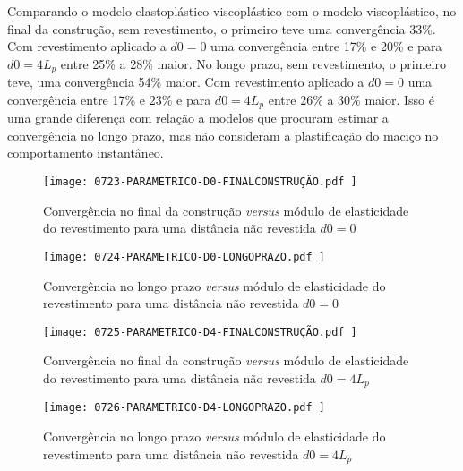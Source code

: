 Comparando o modelo elastoplástico-viscoplástico com o modelo viscoplástico, no final da construção, sem revestimento, o primeiro teve uma convergência 33\%. Com revestimento aplicado a $d0=0$ uma convergência entre 17\% e 20\% e para $d0=4L_p$ entre 25\% a 28\% maior. No longo prazo, sem revestimento, o primeiro teve, uma convergência 54\% maior. Com revestimento aplicado a $d0=0$ uma convergência entre 17\% e 23\% e para $d0=4L_p$ entre 26\% a 30\% maior. Isso é uma grande diferença com relação a modelos que procuram estimar a convergência no longo prazo, mas não consideram a plastificação do maciço no comportamento instantâneo.

\begin{figure}[H]
	\begin{center}
		\texttt{[image: 0723-PARAMETRICO-D0-FINALCONSTRUÇÃO.pdf
		]}
	\end{center}
	\caption{\label{PARAMETRICO-D0-FINALCONSTRUÇÃO}Convergência no final da construção \textit{versus} módulo de elasticidade do revestimento para uma distância não revestida $d0=0$}
\end{figure}

\begin{figure}[H]
	\begin{center}
		\texttt{[image: 0724-PARAMETRICO-D0-LONGOPRAZO.pdf
		]}
	\end{center}
	\caption{\label{PARAMETRICO-D0-LONGOPRAZO}Convergência no longo prazo \textit{versus} módulo de elasticidade do revestimento para uma distância não revestida $d0=0$}
\end{figure}

\begin{figure}[H]
	\begin{center}
		\texttt{[image: 0725-PARAMETRICO-D4-FINALCONSTRUÇÃO.pdf
		]}
	\end{center}
	\caption{\label{PARAMETRICO-D4-FINALCONSTRUÇÃO}Convergência no final da construção \textit{versus} módulo de elasticidade do revestimento para uma distância não revestida $d0=4L_p$}
\end{figure}

\begin{figure}[H]
	\begin{center}
		\texttt{[image: 0726-PARAMETRICO-D4-LONGOPRAZO.pdf
		]}
	\end{center}
	\caption{\label{PARAMETRICO-D4-LONGOPRAZO}Convergência no longo prazo \textit{versus} módulo de elasticidade do revestimento para uma distância não revestida $d0=4L_p$}
\end{figure}

